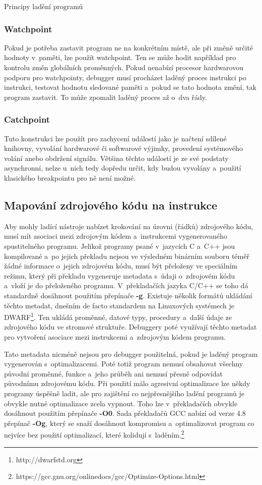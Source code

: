 \documentclass[czech,bachelor,male,python,dept460,hidelinks]{diploma}						%
\newcommand{\parspace}[1][]{
	\ifthenelse{\isempty{#1}}{\vspace{0mm}}{\vspace{#1}}
	\par
}
\begin{document}
\begin{section}{Principy ladění programů}
		\subsubsection{Watchpoint}
			Pokud je potřeba zastavit program ne na konkrétním místě, ale při změně určité hodnoty v~paměti, lze použít watchpoint. Ten se může hodit například pro
			kontrolu změn globálních proměnných. Pokud nenabízí procesor hardwarovou podporu pro watchpointy, debugger musí procházet laděný proces instrukci po
			instrukci, testovat hodnotu sledované paměti a~pokud se tato hodnota změní, tak program zastavit. To může zpomalit laděný proces až
			o~dva řády. \cite{gdb-watchpoints}
		\subsubsection{Catchpoint}
			Tuto konstrukci lze použít pro zachycení událostí jako je načtení sdílené knihovny, vyvolání hardwarové či softwarové výjimky, provedení
			systémového volání anebo obdržení signálu. Většina těchto událostí je ze své podstaty asynchronní, nelze u~nich tedy dopředu určit, kdy budou vyvolány
			a~použití klasického breakpointu pro ně není možné.	
		
	\subsection{Mapování zdrojového kódu na instrukce}
		Aby mohly ladící nástroje nabízet krokování na úrovni (řádků) zdrojového kódu, musí mít asociaci mezi zdrojovým kódem a~instrukcemi vygenerovaného
		spustitelného programu. Jelikož programy psané v~jazycích C a~C++ jsou kompilované a~po jejich překladu nejsou
		ve výsledném binárním souboru téměř žádné informace o~jejich zdrojovém kódu, musí být přeloženy ve speciálním režimu, který při překladu vygeneruje
		metadata s~údaji o~zdrojovém kódu a~vloží je do přeloženého programu. V~překladačích jazyka C/C++ se toho dá standardně dosáhnout použitím
		přepínače \textbf{-g}. Existuje několik formátů ukládání těchto metadat, dnešním de facto standardem na Linuxových systémech je
		DWARF\footnote{http://dwarfstd.org}. Ten ukládá proměnné, datové typy, procedury a~další údaje ze zdrojového kódu ve stromové struktuře.
		Debuggery poté využívají těchto metadat pro vytvoření asociace mezi instrukcemi a~zdrojovým kódem programu.
		
		\parspace Tato metadata nicméně nejsou pro debugger použitelná, pokud je laděný program vygenerován s~optimalizacemi. Poté
		totiž program nemusí obsahovat všechny původní proměnné, funkce a~jeho průběh ani nemusí přesně odpovídat původnímu zdrojovému kódu.
		Při použití málo agresivní optimalizace lze někdy programy úspěšně ladit, ale pro zajištění co nejpřesnějšího ladění programů je obvykle nutné
		optimalizace zcela vypnout. Toho lze v~překladačích obvykle dosáhnout použitím přepínače \textbf{-O0}. Sada překladačů GCC nabízí od verze 4.8
		přepínač \textbf{-Og}, který se snaží dosáhnout kompromisu a~optimalizovat program co nejvíce bez použití optimalizací, které kolidují
		s~laděním.\footnote{https://gcc.gnu.org/onlinedocs/gcc/Optimize-Options.html}
	

\end{section}
\end{document}

